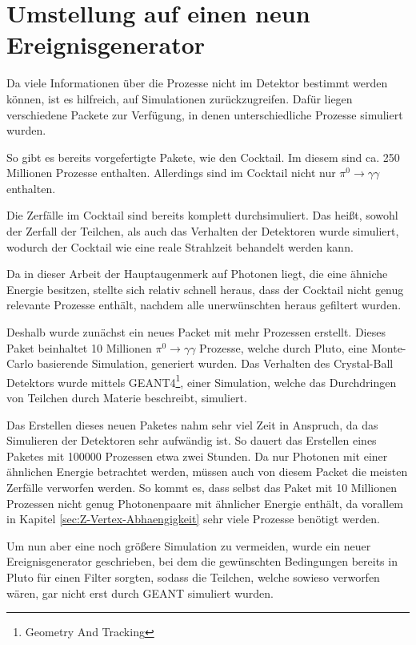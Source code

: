 \documentclass[a4paper,11pt,oneside,final,german,openbib,pdftex]{scrbook}
\begin{document}
{\section{Umstellung auf einen neun Ereignisgenerator}
\label{sec:Vorbereitung-der-Simulation}

Da viele Informationen \"uber die Prozesse nicht im Detektor bestimmt werden k\"onnen, ist es hilfreich, auf Simulationen zur\"uckzugreifen. Daf\"ur liegen verschiedene Packete zur Verf\"ugung, in denen unterschiedliche Prozesse simuliert wurden.

So gibt es bereits vorgefertigte Pakete, wie den Cocktail.
Im diesem sind ca. 250 Millionen Prozesse enthalten. Allerdings sind im Cocktail nicht nur $\pi^0 \rightarrow \gamma \gamma$ enthalten.

Die Zerf\"alle im Cocktail sind bereits komplett durchsimuliert. Das hei{\ss}t, sowohl der Zerfall der Teilchen, als auch das Verhalten der Detektoren wurde simuliert, wodurch der Cocktail wie eine reale Strahlzeit behandelt werden kann.

Da in dieser Arbeit der Hauptaugenmerk auf Photonen liegt, die eine \"ahniche Energie besitzen, stellte sich relativ schnell heraus, dass der Cocktail nicht genug relevante Prozesse enth\"alt, nachdem alle unerw\"unschten heraus gefiltert wurden. 

Deshalb wurde zun\"achst ein neues Packet mit mehr Prozessen erstellt. 
Dieses Paket beinhaltet 10 Millionen $\pi^0 \rightarrow \gamma \gamma$ Prozesse, welche durch Pluto, eine Monte-Carlo basierende Simulation, generiert wurden. Das Verhalten des Crystal-Ball Detektors wurde mittels GEANT4\footnote{Geometry And Tracking}, einer Simulation, welche das Durchdringen von Teilchen durch Materie beschreibt, simuliert.

Das Erstellen dieses neuen Paketes nahm sehr viel Zeit in Anspruch, da das Simulieren der Detektoren sehr aufw\"andig ist. So dauert das Erstellen eines Paketes mit 100000 Prozessen etwa zwei Stunden. Da nur Photonen mit einer \"ahnlichen Energie betrachtet werden, m\"ussen auch von diesem Packet die meisten Zerf\"alle verworfen werden. So kommt es, dass selbst das Paket mit 10 Millionen Prozessen nicht genug Photonenpaare mit \"ahnlicher Energie enth\"alt, da vorallem in Kapitel \ref{sec:Z-Vertex-Abhaengigkeit} sehr viele Prozesse ben\"otigt werden.

Um nun aber eine noch größere Simulation zu vermeiden, wurde ein neuer Ereignisgenerator geschrieben, bei dem die gew\"unschten Bedingungen bereits in Pluto f\"ur einen Filter sorgten, sodass die Teilchen, welche sowieso verworfen w\"aren, gar nicht erst durch GEANT simuliert wurden. 

}
\end{document}
